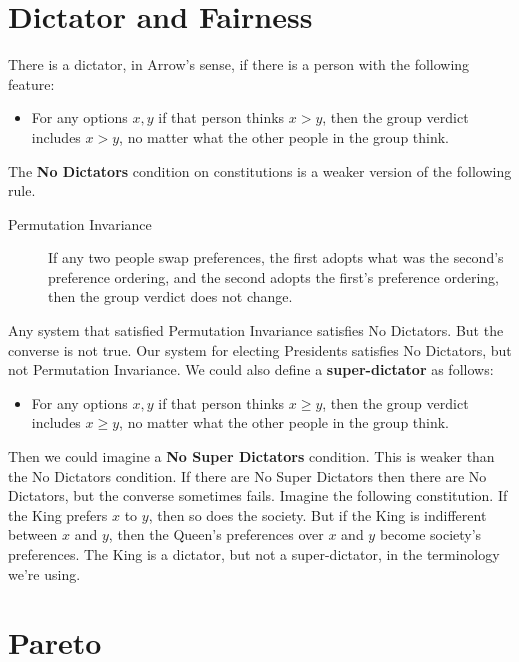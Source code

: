\section{Dictator and Fairness}
\label{dictatorandfairness}

There is a dictator, in Arrow's sense, if there is a person with the following feature:

\begin{itemize}
\item{} For any options $x, y$ if that person thinks $x > y$, then the group verdict includes $x > y$, no matter what the other people in the group think.

\end{itemize}
The \textbf{No Dictators} condition on constitutions is a weaker version of the following rule.

\begin{description}
\item[Permutation Invariance]

If any two people swap preferences, the first adopts what was the second's preference ordering, and the second adopts the first's preference ordering, then the group verdict does not change.
\end{description}
Any system that satisfied Permutation Invariance satisfies No Dictators. But the converse is not true. Our system for electing Presidents satisfies No Dictators, but not Permutation Invariance. We could also define a \textbf{super-dictator} as follows:

\begin{itemize}
\item{} For any options $x, y$ if that person thinks $x \geq y$, then the group verdict includes $x \geq y$, no matter what the other people in the group think.

\end{itemize}
Then we could imagine a \textbf{No Super Dictators} condition. This is weaker than the No Dictators condition. If there are No Super Dictators then there are No Dictators, but the converse sometimes fails. Imagine the following constitution. If the King prefers $x$ to $y$, then so does the society. But if the King is indifferent between $x$ and $y$, then the Queen's preferences over $x$ and $y$ become society's preferences. The King is a dictator, but not a super-dictator, in the terminology we're using.

\section{Pareto}
\label{pareto}

